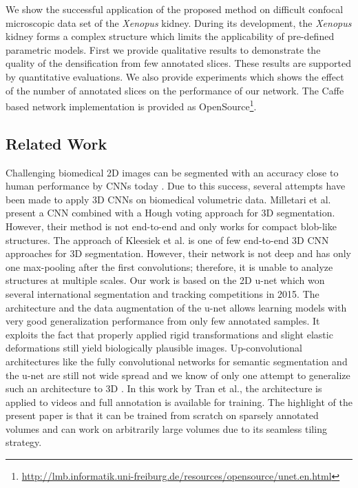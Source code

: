 \documentclass[runningheads,a4paper]{llncs}
\newcommand{\species}[1]{\textit{#1}}
\begin{document}
We show the successful application of the proposed method on difficult confocal microscopic data set of the \species{Xenopus} kidney. During its development, the \species{Xenopus} kidney forms a complex structure \cite{soeren} which limits the applicability of pre-defined parametric models.
First we provide qualitative results to demonstrate the quality of the densification from few annotated slices. These results are supported by quantitative evaluations. We also provide experiments which shows the effect of the number of annotated slices on the performance of our network. The Caffe\cite{caffe} based network implementation is provided as OpenSource\footnote{\url{http://lmb.informatik.uni-freiburg.de/resources/opensource/unet.en.html}}. 

\subsection{Related Work}

Challenging biomedical 2D images can be segmented with an accuracy close to human performance by CNNs today \cite{unet,2dnet1,2dnet2}. Due to this success, several attempts have been made to apply 3D CNNs on biomedical volumetric data. Milletari et al. \cite{hough-cnn} present a CNN combined with a Hough voting approach for 3D segmentation. However, their method is not end-to-end and only works for compact blob-like structures. The approach of Kleesiek et al. \cite{deepmri} is one of few end-to-end 3D CNN approaches for 3D segmentation. However, their network is not deep and has only one max-pooling after the first convolutions; therefore, it is unable to analyze structures at multiple scales. 
Our work is based on the 2D u-net \cite{unet} which won several international segmentation and tracking competitions in 2015. The architecture and the data augmentation of the u-net allows learning models with very good generalization performance from only few annotated samples. It exploits the fact that properly applied rigid transformations and slight elastic deformations still yield biologically plausible images. 
Up-convolutional architectures like the fully convolutional networks for semantic segmentation \cite{fcn} and the u-net are still not wide spread and we know of only one attempt to generalize such an architecture to 3D \cite{tran}. In this work by Tran et al., the architecture is applied to videos and full annotation is available for training. The highlight of the present paper is that it can be trained from scratch on sparsely annotated volumes and can work on arbitrarily large volumes due to its seamless tiling strategy. 
\end{document}
